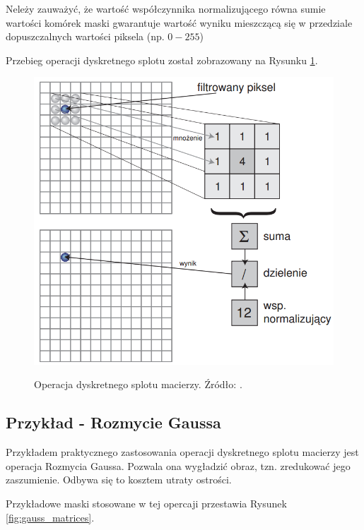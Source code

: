 \documentclass[a4paper,twocolumn,12pt]{article}
\begin{document}
Neleży zauważyć, że wartość współczynnika normalizującego równa sumie wartości komórek maski gwarantuje wartość wyniku mieszczącą się w przedziale dopuszczalnych wartości piksela (np. $0-255$)

Przebieg operacji dyskretnego splotu został zobrazowany na Rysunku \ref{fig:convolution}.

\begin{figure}[!ht]
 \begin{center}
  \scalebox{0.25}
  {
   \includegraphics{../obrazki/filtry/splot.png}
  }
 \end{center}
 \caption{
  Operacja dyskretnego splotu macierzy.
  Źródło: \cite{stec}.
 }
 \label{fig:convolution}
\end{figure}


\subsection{Przykład - Rozmycie Gaussa}

Przykładem praktycznego zastosowania operacji dyskretnego splotu macierzy jest operacja Rozmycia Gaussa.
Pozwala ona wygładzić obraz, tzn. zredukować jego zaszumienie.
Odbywa się to kosztem utraty ostrości.

Przykładowe maski stosowane w tej opercaji przestawia Rysunek \ref{fig:gauss_matrices}.
\end{document}
